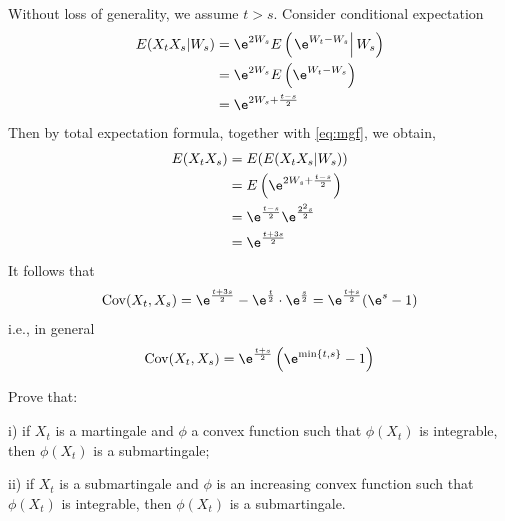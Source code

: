     Without loss of generality, we assume $t>s$.
    Consider conditional expectation
    \[\begin{aligned}
        E(X_tX_s|W_s)&=\e^{2W_s}E\left(\left.\e^{W_t-W_s}\right|W_s\right)\\
        &=\e^{2W_s}E\left(\e^{W_t-W_s}\right)\\
        &=\e^{2W_s+\frac{t-s}{2}}
    \end{aligned}\]
    Then by total expectation formula, together with
    \cref{eq:mgf}, we obtain,
    \[\begin{aligned}
        E(X_tX_s)&=E(E(X_tX_s|W_s))\\
                 &=E\left(\e^{2W_s+\frac{t-s}{2}}\right)\\
                 &=\e^{\frac{t-s}{2}}\e^{\frac{2^2s}{2}}\\
                 &=\e^{\frac{t+3s}{2}}
    \end{aligned}\]
    It follows that
    \[\Cov(X_t,X_s)=\e^{\frac{t+3s}{2}}
    -\e^{\frac{t}{2}}\cdot\e^{\frac{s}{2}}
    =\e^{\frac{t+s}{2}}(\e^s-1)\]
    i.e., in general
    \[\Cov(X_t,X_s)=\e^{\frac{t+s}{2}}\left(\e^{\min\{t,s\}}-1\right)\]

    \problem
    \begin{question}
        Prove that:

        \noindent i) if $X_t$ is a martingale and $\phi$ a convex function 
        such that $\phi(X_t)$ is integrable, then $\phi(X_t)$ is a submartingale;

        \noindent ii) if $X_t$ is a submartingale and $\phi$ is an increasing convex 
        function such that $\phi(X_t)$ is integrable, then $\phi(X_t)$ is a submartingale.
    \end{question}

